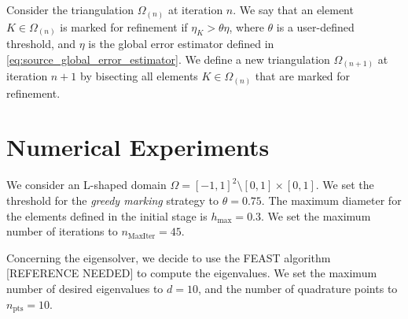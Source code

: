 \documentclass[12pt]{amsart}
\begin{document}
Consider the triangulation \(\Omega_{(n)}\) at iteration \(n\).
We say that an element \(K \in \Omega_{(n)}\) is marked for refinement if \(\eta_K > \theta \eta\), where \(\theta\) is a user-defined threshold, and \(\eta\) is the global error estimator defined in \eqref{eq:source_global_error_estimator}.
We define a new triangulation \(\Omega_{(n+1)}\) at iteration \(n+1\) by bisecting all elements \(K \in \Omega_{(n)}\) that are marked for refinement.

\section{Numerical Experiments}

%   
%   

We consider an L-shaped domain \(\Omega = [-1, 1]^2 \setminus [0, 1] \times [0, 1]\).
We set the threshold for the \emph{greedy marking} strategy to \(\theta = 0.75\).
The maximum diameter for the elements defined in the initial stage is \(h_{\max} = 0.3\).
We set the maximum number of iterations to \(n_{\operatorname{MaxIter}} = 45\).

Concerning the eigensolver, we decide to use the FEAST algorithm [REFERENCE NEEDED] to compute the eigenvalues.
We set the maximum number of desired eigenvalues to \(d = 10\), and the number of quadrature points to \(n_{\operatorname{pts}} = 10\).
\end{document}
